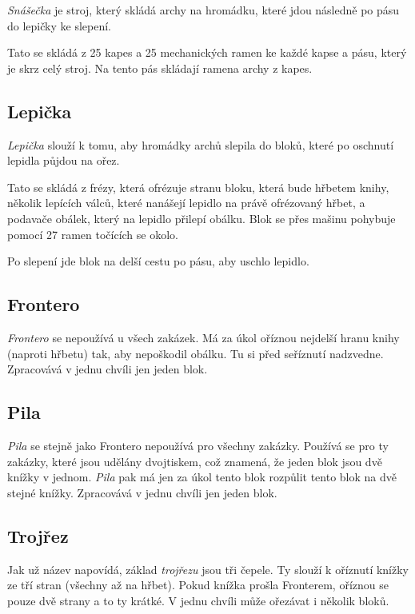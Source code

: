 \documentclass[a4paper, 11pt]{article}
\begin{document}
\emph{Snášečka} je stroj, který skládá archy na hromádku, které jdou následně po pásu do lepičky ke slepení. 

Tato se skládá z 25 kapes a 25 mechanických ramen ke každé kapse a pásu, který je skrz celý stroj. Na tento pás skládají ramena archy z kapes.

\subsection{Lepička}

\emph{Lepička} slouží k tomu, aby hromádky archů slepila do bloků, které po oschnutí lepidla půjdou na ořez.

Tato se skládá z frézy, která ofrézuje stranu bloku, která bude hřbetem knihy, několik lepících válců, které nanášejí lepidlo na právě ofrézovaný hřbet, a podavače obálek, který na lepidlo přilepí obálku. Blok se přes mašinu pohybuje pomocí 27 ramen točících se okolo.

Po slepení jde blok na delší cestu po pásu, aby uschlo lepidlo.

\subsection{Frontero}

\emph{Frontero} se nepoužívá u všech zakázek. Má za úkol oříznou nejdelší hranu knihy (naproti hřbetu) tak, aby nepoškodil obálku. Tu si před seříznutí nadzvedne. Zpracovává v jednu chvíli jen jeden blok.

\subsection{Pila}

\emph{Pila} se stejně jako Frontero nepoužívá pro všechny zakázky. Používá se pro ty zakázky, které jsou udělány dvojtiskem, což znamená, že jeden blok jsou dvě knížky v jednom. \emph{Pila} pak má jen za úkol tento blok rozpůlit tento blok na dvě stejné knížky. Zpracovává v jednu chvíli jen jeden blok.

\subsection{Trojřez}

Jak už název napovídá, základ \emph{trojřezu} jsou tři čepele. Ty slouží k oříznutí knížky ze tří stran (všechny až na hřbet). Pokud knížka prošla Fronterem, oříznou se pouze dvě strany a to ty krátké. V jednu chvíli může ořezávat i několik bloků.
\end{document}

